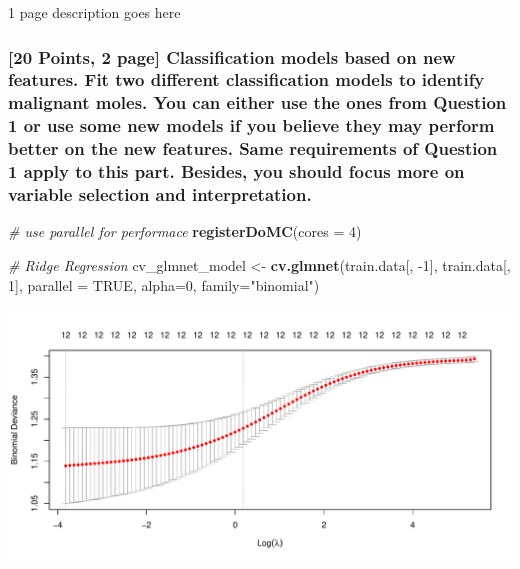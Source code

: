 \documentclass[]{article}
\newenvironment{Shaded}{\begin{snugshade}}{\end{snugshade}}
\newcommand{\CommentTok}[1]{\textcolor[rgb]{0.56,0.35,0.01}{\textit{#1}}}
\newcommand{\DataTypeTok}[1]{\textcolor[rgb]{0.13,0.29,0.53}{#1}}
\newcommand{\DecValTok}[1]{\textcolor[rgb]{0.00,0.00,0.81}{#1}}
\newcommand{\KeywordTok}[1]{\textcolor[rgb]{0.13,0.29,0.53}{\textbf{#1}}}
\newcommand{\NormalTok}[1]{#1}
\newcommand{\OtherTok}[1]{\textcolor[rgb]{0.56,0.35,0.01}{#1}}
\newcommand{\StringTok}[1]{\textcolor[rgb]{0.31,0.60,0.02}{#1}}
\begin{document}
1 page description goes here

\hypertarget{points-2-page-classification-models-based-on-new-features.-fit-two-different-classification-models-to-identify-malignant-moles.-you-can-either-use-the-ones-from-question-1-or-use-some-new-models-if-you-believe-they-may-perform-better-on-the-new-features.-same-requirements-of-question-1-apply-to-this-part.-besides-you-should-focus-more-on-variable-selection-and-interpretation.}{%
\subsubsection{{[}20 Points, 2 page{]} Classification models based on
new features. Fit two different classification models to identify
malignant moles. You can either use the ones from Question 1 or use some
new models if you believe they may perform better on the new features.
Same requirements of Question 1 apply to this part. Besides, you should
focus more on variable selection and
interpretation.}\label{points-2-page-classification-models-based-on-new-features.-fit-two-different-classification-models-to-identify-malignant-moles.-you-can-either-use-the-ones-from-question-1-or-use-some-new-models-if-you-believe-they-may-perform-better-on-the-new-features.-same-requirements-of-question-1-apply-to-this-part.-besides-you-should-focus-more-on-variable-selection-and-interpretation.}}

\begin{Shaded}
\begin{Highlighting}[]
\CommentTok{# use parallel for performace }
  \KeywordTok{registerDoMC}\NormalTok{(}\DataTypeTok{cores =} \DecValTok{4}\NormalTok{)}

  \CommentTok{# Ridge Regression}
\NormalTok{  cv_glmnet_model <-}\StringTok{ }\KeywordTok{cv.glmnet}\NormalTok{(train.data[, }\DecValTok{-1}\NormalTok{], train.data[, }\DecValTok{1}\NormalTok{], }\DataTypeTok{parallel =} \OtherTok{TRUE}\NormalTok{, }\DataTypeTok{alpha=}\DecValTok{0}\NormalTok{, }\DataTypeTok{family=}\StringTok{"binomial"}\NormalTok{)}
\end{Highlighting}
\end{Shaded}

\begin{center}\includegraphics[width=1\linewidth]{Project2_as81_files/figure-latex/unnamed-chunk-35-1} \end{center}
\end{document}
